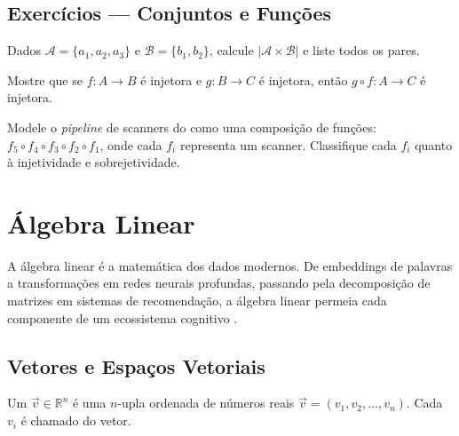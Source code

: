 \subsection{Exercícios — Conjuntos e Funções}

\begin{exercicio}
    Dados $\mathcal{A} = \{a_1, a_2, a_3\}$ e $\mathcal{B} = \{b_1, b_2\}$,
    calcule $|\mathcal{A} \times \mathcal{B}|$ e liste todos os pares.
\end{exercicio}

\begin{exercicio}
    Mostre que se $f: A \to B$ é injetora e $g: B \to C$ é injetora, então
    $g \circ f: A \to C$ é injetora.
\end{exercicio}

\begin{exercicio}
    Modele o \textit{pipeline} de scanners do \opencodeeco{} como uma
    composição de funções: $f_5 \circ f_4 \circ f_3 \circ f_2 \circ f_1$,
    onde cada $f_i$ representa um scanner. Classifique cada $f_i$ quanto à
    injetividade e sobrejetividade.
\end{exercicio}

\section{Álgebra Linear}
\label{sec:algebra-linear}
\nivelintermediario

A álgebra linear é a matemática dos dados modernos. De embeddings de palavras
a transformações em redes neurais profundas, passando pela decomposição de
matrizes em sistemas de recomendação, a álgebra linear permeia cada
componente de um ecossistema cognitivo \cite{strang2016algebra,
goodfellow2016deep, bishop2006pattern}.

\subsection{Vetores e Espaços Vetoriais}

\begin{definicao}[Vetor]
    Um  $\vec{v} \in \mathbb{R}^n$ é uma $n$-upla ordenada
    de números reais $\vec{v} = (v_1, v_2, \ldots, v_n)$. Cada $v_i$ é
    chamado  do vetor.
\end{definicao}

